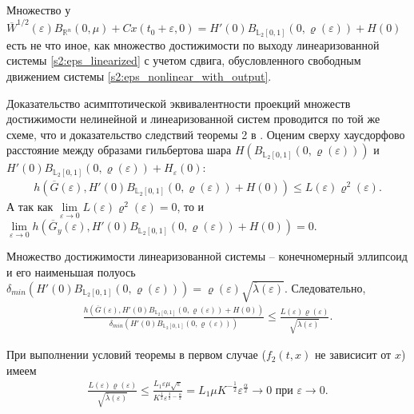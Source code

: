 \documentclass[../main.tex]{subfiles}
\begin{document}
    Множество у $\overline{W}^{1/2}(\varepsilon)B_{\mathbb{R}^n}(0,\mu) + Cx(t_0+\varepsilon,0)  = H'(0)B_{\mathbb{L}_2[0,1]}(0,\varrho(\varepsilon))+ H(0)$ есть не что иное, как множество достижимости по выходу линеаризованной системы \eqref{s2:eps_linearized} с учетом сдвига, обусловленного свободным движением системы \eqref{s2:eps_nonlinear_with_output}.
    
    Доказательство асимптотической эквивалентности проекций множеств достижимости нелинейной и линеаризованной систем проводится по той же схеме, что и доказательство следствий теоремы 2 в \cite{GusevUMJ}. Оценим сверху хаусдорфово расстояние между образами гильбертова шара $ H\left( B_{\mathbb{L}_2[0,1]}(0,\varrho(\varepsilon))\right)  $ и $ H'(0)B_{\mathbb{L}_2[0,1]}(0,\varrho(\varepsilon))+ H_{\varepsilon}(0) $:
    \begin{gather*}
        h\left( \overline{G}(\varepsilon), H'(0)B_{\mathbb{L}_2[0,1]}(0,\varrho(\varepsilon))+ H(0)\right)  \leqslant L(\varepsilon) \varrho^2(\varepsilon).
    \end{gather*}
    А так как $ \lim\limits_{\varepsilon \rightarrow 0}  L(\varepsilon) \varrho^2(\varepsilon) = 0 $, то и $ \lim\limits_{\varepsilon \rightarrow 0} h\left( \overline{G}_y(\varepsilon), H'(0)B_{\mathbb{L}_2[0,1]}(0,\varrho(\varepsilon))+ H(0)\right)  = 0 $.
    
    
    Множество достижимости линеаризованной системы -- конечномерный эллипсоид и его наименьшая полуось $ \delta_{min}\left(H'(0)B_{\mathbb{L}_2[0,1]}(0,\varrho(\varepsilon)) \right)=\varrho(\varepsilon)\sqrt{\overline{\lambda}(\varepsilon)} $. 
    Следовательно,
    \begin{gather*}
        \frac{h\left(\overline{G}(\varepsilon), H'(0)B_{\mathbb{L}_2[0,1]}(0,\varrho(\varepsilon))+ H(0)\right) }{\delta_{min}\left( H'(0)B_{\mathbb{L}_2[0,1]}(0,\varrho(\varepsilon))\right) } \leqslant \frac{L(\varepsilon) \varrho(\varepsilon)}{\sqrt{\overline{\lambda}(\varepsilon)}}.
    \end{gather*}
    
    При выполнении условий теоремы в первом случае ($ f_2(t,x) $ не зависисит от $ x $) имеем
    \begin{gather*}
        \frac{L(\varepsilon) \varrho(\varepsilon)}{\sqrt{\overline{\lambda}(\varepsilon)}} 
        \leqslant
        \frac{L_1\varepsilon\mu\sqrt{\varepsilon}}{K^{\frac{1}{2}}\varepsilon^{\frac{3}{2}-\frac{\alpha}{2}}} 
        =
        L_1\mu K^{-\frac{1}{2}}\varepsilon^{\frac{\alpha}{2}} \rightarrow 0 \mbox{\ при\ } \varepsilon \rightarrow 0.
    \end{gather*}
    
\end{document}

